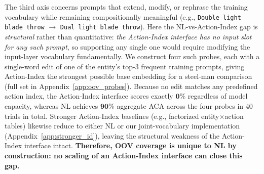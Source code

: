 The third axis concerns prompts that extend, modify, or rephrase the training vocabulary 
while remaining compositionally meaningful
(e.g., \texttt{Double light blade throw} $\to$ \texttt{Dual light blade throw}). 
Here the NL-vs-Action-Index gap is \textit{structural} rather than quantitative: 
\emph{the Action-Index interface has no input slot for any such prompt}, so 
supporting any single one would require modifying the input-layer vocabulary 
fundamentally.
We construct four such probes, each with a single-word edit of one of the entity's 
top-$3$ frequent training prompts, giving Action-Index the strongest possible base 
embedding for a steel-man comparison (full set in Appendix~\ref{app:oov_probes}).  
Because no edit matches any predefined action index, the Action-Index interface scores exactly $\mathbf{0\%}$ 
regardless of model capacity, whereas NL achieves $\mathbf{90\%}$ aggregate ACA across 
the four probes in $40$ trials in total.
Stronger Action-Index baselines (e.g., factorized entity$\times$action tables) likewise reduce to either NL or our joint-vocabulary implementation (Appendix~\ref{app:stronger_id}), leaving the structural weakness of the Action-Index interface intact.
\textbf{Therefore, OOV coverage is unique to NL by construction: no scaling of an Action-Index interface can 
close this gap.}




